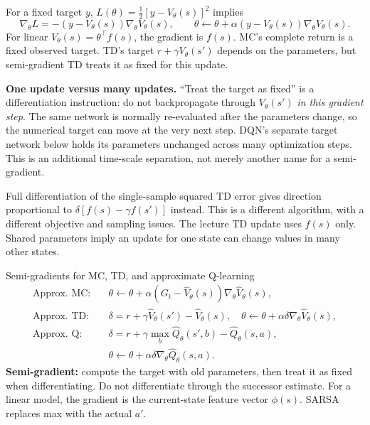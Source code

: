 \documentclass[10pt,a4paper]{article}
\begin{document}
\begin{prf}
For a fixed target $y$, $L(\theta)=\tfrac12[y-V_\theta(s)]^2$ implies
\[
\nabla_\theta L=-(y-V_\theta(s))\nabla_\theta V_\theta(s),\qquad
\theta\leftarrow\theta+\alpha(y-V_\theta(s))\nabla_\theta V_\theta(s).
\]
For linear $V_\theta(s)=\theta^\top f(s)$, the gradient is $f(s)$. MC's complete return is a fixed observed target. TD's target $r+\gamma V_\theta(s')$ depends on the parameters, but semi-gradient TD treats it as fixed for this update.

\textbf{One update versus many updates.} ``Treat the target as fixed'' is a differentiation instruction: do not backpropagate through $V_\theta(s')$ \emph{in this gradient step}. The same network is normally re-evaluated after the parameters change, so the numerical target can move at the very next step. DQN's separate target network below holds its parameters unchanged across many optimization steps. This is an additional time-scale separation, not merely another name for a semi-gradient.

Full differentiation of the single-sample squared TD error gives direction proportional to $\delta[f(s)-\gamma f(s')]$ instead. This is a different algorithm, with a different objective and sampling issues. The lecture TD update uses $f(s)$ only. Shared parameters imply an update for one state can change values in many other states.
\end{prf}

\begin{card}{Semi-gradients for MC, TD, and approximate Q-learning}
\[
\begin{aligned}
\text{Approx. MC:}\quad &\theta\leftarrow\theta+\alpha(G_t-\hat V_\theta(s))\nabla_\theta\hat V_\theta(s),\\
\text{Approx. TD:}\quad &\delta=r+\gamma\hat V_\theta(s')-\hat V_\theta(s),\quad
\theta\leftarrow\theta+\alpha\delta\nabla_\theta\hat V_\theta(s),\\
\text{Approx. Q:}\quad &\delta=r+\gamma\max_b\hat Q_\theta(s',b)-\hat Q_\theta(s,a),\\
&\theta\leftarrow\theta+\alpha\delta\nabla_\theta\hat Q_\theta(s,a).
\end{aligned}
\]
\textbf{Semi-gradient:} compute the target with old parameters, then treat it as fixed when differentiating. Do not differentiate through the successor estimate. For a linear model, the gradient is the current-state feature vector $\phi(s)$. SARSA replaces max with the actual $a'$.
\end{card}
\end{document}
